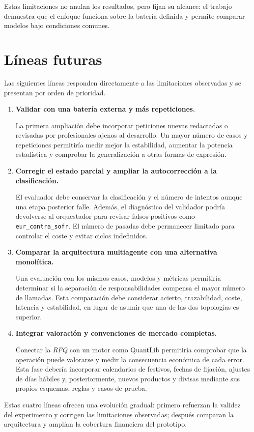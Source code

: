 Estas limitaciones no anulan los resultados, pero fijan su alcance: el trabajo demuestra que el enfoque funciona sobre la batería definida y permite comparar modelos bajo condiciones comunes.

\section{Líneas futuras}
\label{sec:lineas_futuras}

Las siguientes líneas responden directamente a las limitaciones observadas y se presentan por orden de prioridad.

\begin{enumerate}
    \item \textbf{Validar con una batería externa y más repeticiones.}

    La primera ampliación debe incorporar peticiones nuevas redactadas o revisadas por profesionales ajenos al desarrollo. Un mayor número de casos y repeticiones permitiría medir mejor la estabilidad, aumentar la potencia estadística y comprobar la generalización a otras formas de expresión.

    \item \textbf{Corregir el estado parcial y ampliar la autocorrección a la clasificación.}

    El evaluador debe conservar la clasificación y el número de intentos aunque una etapa posterior falle. Además, el diagnóstico del validador podría devolverse al orquestador para revisar falsos positivos como \texttt{eur\_contra\_sofr}. El número de pasadas debe permanecer limitado para controlar el coste y evitar ciclos indefinidos.

    \item \textbf{Comparar la arquitectura multiagente con una alternativa monolítica.}

    Una evaluación con los mismos casos, modelos y métricas permitiría determinar si la separación de responsabilidades compensa el mayor número de llamadas. Esta comparación debe considerar acierto, trazabilidad, coste, latencia y estabilidad, en lugar de asumir que una de las dos topologías es superior.

    \item \textbf{Integrar valoración y convenciones de mercado completas.}

    Conectar la \textit{RFQ} con un motor como QuantLib permitiría comprobar que la operación puede valorarse y medir la consecuencia económica de cada error. Esta fase debería incorporar calendarios de festivos, fechas de fijación, ajustes de días hábiles y, posteriormente, nuevos productos y divisas mediante sus propios esquemas, reglas y casos de prueba.
\end{enumerate}

Estas cuatro líneas ofrecen una evolución gradual: primero refuerzan la validez del experimento y corrigen las limitaciones observadas; después comparan la arquitectura y amplían la cobertura financiera del prototipo.
